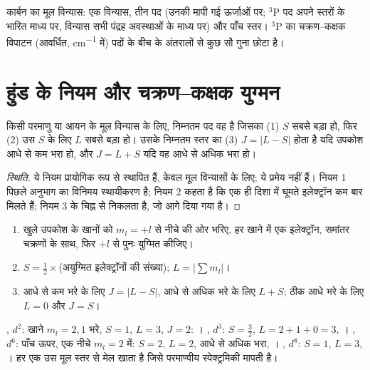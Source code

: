 \begin{omfigure}
{\small कार्बन का मूल विन्यास: एक विन्यास, तीन पद
(उनकी मापी गई ऊर्जाओं पर; ${}^3$P पद अपने स्तरों के भारित माध्य पर,
विन्यास सभी पंद्रह अवस्थाओं के माध्य पर) और पाँच
स्तर। ${}^3$P का चक्रण--कक्षक विपाटन (आवर्धित,
\unit{cm^{-1}} में) पदों के बीच के अंतरालों से कुछ सौ गुना छोटा
है।}
\end{omfigure}

\section{हुंड के नियम और चक्रण--कक्षक युग्मन}

\begin{proposition}[पदों के लिए हुंड के नियम]\label{prop:b3:many-electron-atoms:hund-terms}
किसी परमाणु या आयन के मूल विन्यास के लिए, निम्नतम पद वह है जिसका
(1) $S$ सबसे बड़ा हो, फिर (2) उस $S$ के लिए $L$ सबसे बड़ा हो। उसके निम्नतम
स्तर का (3) $J = |L - S|$ होता है यदि उपकोश आधे से कम भरा हो, और $J = L +
S$ यदि वह आधे से अधिक भरा हो।
\end{proposition}
\begin{proof}[स्थिति]
ये नियम प्रायोगिक रूप से स्थापित हैं, केवल मूल विन्यासों के लिए;
ये प्रमेय नहीं हैं। नियम 1 पिछले अनुभाग का विनिमय स्थायीकरण है;
नियम 2 कहता है कि एक ही दिशा में घूमते इलेक्ट्रॉन कम बार मिलते हैं;
नियम 3  के चिह्न से निकलता है, जो आगे दिया गया है।
\end{proof}

\begin{method}[खाना आरेख से मूल पद]\label{met:b3:many-electron-atoms:ground-term}
\begin{enumerate}
  \item खुले उपकोश के खानों को $m_l = +l$ से नीचे की ओर भरिए, हर खाने में एक
        इलेक्ट्रॉन, समांतर चक्रणों के साथ, फिर $+l$ से पुनः युग्मित कीजिए।
  \item $S = \frac12 \times$(अयुग्मित इलेक्ट्रॉनों की संख्या); $L = |\sum m_l|$।
  \item आधे से कम भरे के लिए $J = |L - S|$, आधे से अधिक भरे के लिए $L + S$;
        ठीक आधे भरे के लिए $L = 0$ और $J = S$।
\end{enumerate}
\end{method}

\begin{example}[मूल पद]\label{ex:b3:many-electron-atoms:ground-terms}
, $d^2$: खाने $m_l = 2, 1$ भरे, $S = 1$, $L = 3$, $J = 2$:
। , $d^3$: $S = \frac32$, $L = 2 + 1 + 0 = 3$,
। , $d^6$: पाँच ऊपर, एक नीचे $m_l = 2$ में:
$S = 2$, $L = 2$, आधे से अधिक भरा, । , $d^8$:
$S = 1$, $L = 3$, । हर एक उस मूल स्तर से मेल खाता है जिसे
परमाण्वीय स्पेक्ट्रमिकी मापती है।
\end{example}

